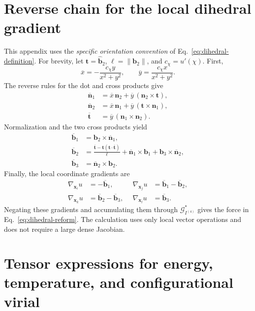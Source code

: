 \documentclass[11pt,a4paper]{article}
\newcommand{\norm}[1]{\left\lVert #1\right\rVert}
\newcommand{\vect}[1]{\bm{#1}}
\theoremstyle{definition}
\begin{document}
\section{Reverse chain for the local dihedral gradient}
\label{app:torsion}
This appendix uses the \emph{specific orientation convention} of
Eq.~\eqref{eq:dihedral-definition}. For brevity, let $\vect t=\widehat{\vect b}_2$, $\ell=\norm{\vect
b_2}$, and $c_\chi=u'(\chi)$. First,
\begin{equation}
\overline x=-\frac{c_\chi y}{x^2+y^2},\qquad
\overline y=\frac{c_\chi x}{x^2+y^2}.
\end{equation}
The reverse rules for the dot and cross products give
\begin{align}
\overline{\vect n}_1&=\overline x\,\vect n_2
+\overline y\,(\vect n_2\times\vect t),\\
\overline{\vect n}_2&=\overline x\,\vect n_1
+\overline y\,(\vect t\times\vect n_1),\\
\overline{\vect t}&=\overline y\,(\vect n_1\times\vect n_2).
\end{align}
Normalization and the two cross products yield
\begin{align}
\overline{\vect b}_1&=\vect b_2\times\overline{\vect n}_1,\\
\overline{\vect b}_2&=
\frac{\overline{\vect t}-\vect t(\vect t\cdot\overline{\vect t})}{\ell}
+\overline{\vect n}_1\times\vect b_1
+\vect b_3\times\overline{\vect n}_2,\\
\overline{\vect b}_3&=\overline{\vect n}_2\times\vect b_2.
\end{align}
Finally, the local coordinate gradients are
\begin{equation}
\begin{aligned}
\nabla_{\vect x_i}u&=-\overline{\vect b}_1,\qquad &
\nabla_{\vect x_j}u&=\overline{\vect b}_1-\overline{\vect b}_2,\\
\nabla_{\vect x_k}u&=\overline{\vect b}_2-\overline{\vect b}_3, &
\nabla_{\vect x_l}u&=\overline{\vect b}_3.
\end{aligned}
\end{equation}
Negating these gradients and accumulating them through $\mathcal G_{I^{(4)}}^*$ gives the force
in Eq.~\eqref{eq:dihedral-reform}. The calculation uses only local vector operations and does
not require a large dense Jacobian.
\section{Tensor expressions for energy, temperature, and configurational virial}
\label{sec:observables}
\end{document}
